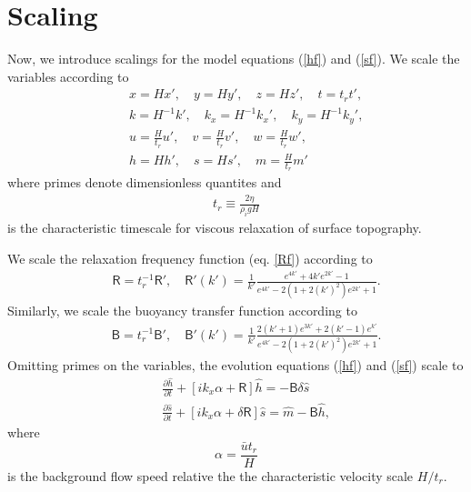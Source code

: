 \documentclass[paper=a4, fontsize=11pt]{article} %
\begin{document}
\section{Scaling}
Now, we introduce scalings for the model equations (\ref{hf}) and (\ref{sf}).
We scale the variables according to
\begin{eqnarray}
  && x = Hx',\quad y=Hy',\quad z=Hz', \quad t = t_r t', \nonumber \\
&&k = H^{-1}k' , \quad k_x = H^{-1}k_x', \quad k_y  = H^{-1}k_y', \nonumber\\
&&u = \frac{H}{t_r}u',\quad v = \frac{H}{t_r}v',\quad w = \frac{H}{t_r}w',\nonumber\\
&& h = H h', \quad s = H s' ,\quad m = \frac{H}{t_r} m' \label{scaling}
\end{eqnarray}
where primes denote dimensionless quantites and
\begin{eqnarray}
t_r \equiv \frac{2\eta}{\rho_i gH} \label{t_relax}
\end{eqnarray}
is the characteristic timescale for viscous relaxation of surface topography.

We scale the relaxation frequency function (eq. \ref{Rf}) according to
\begin{eqnarray}
   &&\mathsf{R} = t_r^{-1} \mathsf{R}', \quad
 \mathsf{R}'(k') =  \frac{1}{k'}\frac{e^{4k'} +4k' e^{2k'} -1 }{e^{4k'} -2(1+2(k')^2)e^{2k'} +1}. \label{Rfsc}
\end{eqnarray}
Similarly, we scale the buoyancy transfer function according to
\begin{eqnarray}
   &&\mathsf{B} =  t_r^{-1} \mathsf{B}', \quad
 \mathsf{B}'(k') =   \frac{1}{k'}\frac{ 2(k'+1)e^{3k'}+2(k'-1)e^{k'} }{e^{4k'} -2(1+2(k')^2)e^{2k'} +1}. \label{Bsc}
\end{eqnarray}
Omitting primes on the variables, the evolution equations (\ref{hf}) and (\ref{sf}) scale to
\begin{eqnarray}
&&\frac{\partial \widehat{h}}{\partial t}+ \left[ik_x {\alpha}  +  \mathsf{R}\right]\widehat{h} = - \mathsf{B}\delta\widehat{s}\label{hfsc}\\
&&\frac{\partial \widehat{s}}{\partial t}+ [ik_x{\alpha}  + \delta \mathsf{R}]\widehat{s} = \widehat{m} -  \mathsf{B} \widehat{h},\label{sfsc}
\end{eqnarray}
where
\begin{equation}
\alpha = \frac{\bar{u} t_r}{H}  \label{uh_eq}
\end{equation}
is the background flow speed relative the the characteristic velocity scale
$H/t_r$.
\end{document}
